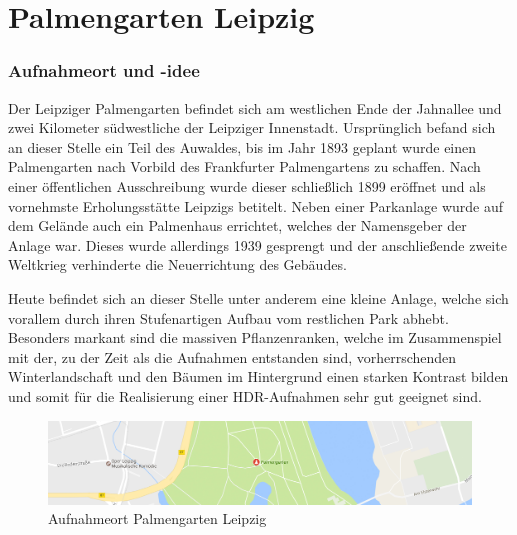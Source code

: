 \documentclass[liststotoc,bibtotoc,fontsize=14pt,]{scrreprt}
\begin{document}
\section{Palmengarten Leipzig}
\label{sec:palme}
\subsubsection{Aufnahmeort und -idee}
Der Leipziger Palmengarten befindet sich am westlichen Ende der Jahnallee und zwei Kilometer südwestliche der Leipziger Innenstadt. Ursprünglich befand sich an dieser Stelle ein Teil des Auwaldes, bis im Jahr 1893 geplant wurde einen Palmengarten nach Vorbild des Frankfurter Palmengartens zu schaffen. Nach einer öffentlichen Ausschreibung wurde dieser schließlich 1899 eröffnet und als vornehmste Erholungsstätte Leipzigs betitelt. Neben einer Parkanlage wurde auf dem Gelände auch ein Palmenhaus errichtet, welches der Namensgeber der Anlage war. Dieses wurde allerdings 1939 gesprengt und der anschließende zweite Weltkrieg verhinderte die Neuerrichtung des Gebäudes. 

\bigskip
Heute befindet sich an dieser Stelle unter anderem eine kleine Anlage, welche sich vorallem durch ihren Stufenartigen Aufbau vom restlichen Park abhebt. Besonders markant sind die massiven Pflanzenranken, welche im Zusammenspiel mit der, zu der Zeit als die Aufnahmen entstanden sind, vorherrschenden Winterlandschaft und den Bäumen im Hintergrund einen starken Kontrast bilden und somit für die Realisierung einer HDR-Aufnahmen sehr gut geeignet sind. 

\begin{figure}[H]
	\includegraphics[width=\linewidth]{img/places/palmen_map.jpg}
	\caption{Aufnahmeort Palmengarten Leipzig}
	\label{img:ak_map}
\end{figure}
\end{document}
